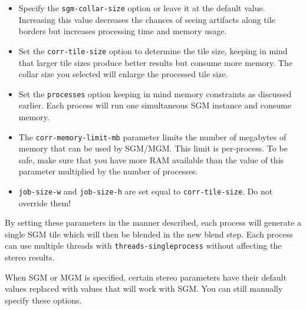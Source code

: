 \begin{itemize}
\item Specify the \texttt{sgm-collar-size} option or leave it at the default value.  Increasing this value decreases
the chances of seeing artifacts along tile borders but increases processing time and memory usage.
\item Set the \texttt{corr-tile-size} option to determine the tile size, keeping in mind that larger tile sizes
produce better results but consume more memory.  The collar size you selected will enlarge the processed tile size.
\item Set the \texttt{processes} option keeping in mind memory constraints as discussed earlier.  Each process will 
run one simultaneous SGM instance and consume memory.
\item The \texttt{corr-memory-limit-mb} parameter limits the number of megabytes of memory that can be used by SGM/MGM.
This limit is per-process. To be safe, make sure that you have more RAM available than the value of this parameter
multiplied by the number of processes.
\item \texttt{job-size-w} and \texttt{job-size-h} are set equal to \texttt{corr-tile-size}.  Do not override them!
\end{itemize}

By setting these parameters in the manner described, each process will generate a single SGM tile which will then be
blended in the new blend step.  Each process can use multiple threads with \texttt{threads-singleprocess} without
affecting the stereo results.

When SGM or MGM is specified, certain stereo parameters have their default values
replaced with values that will work with SGM.  You can still manually specify these
options.

